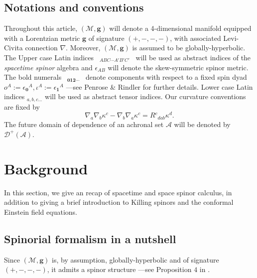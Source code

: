 \documentclass[10pt,a4paper]{article}
\theoremstyle{plain}
\def\bmg{{\bm g}}
\begin{document}
\subsection*{Notations and conventions}

Throughout this article, $(\mathcal{M}, \bmg)$ will denote a
4-dimensional manifold equipped with a Lorentzian metric $\bmg$ of
signature $(+, -, -, -)$, with associated Levi-Civita connection
$\nabla$.  Moreover, $(\mathcal{M}, \bmg)$ is assumed to be
globally-hyperbolic. The Upper case Latin indices ~$_{ABC\cdots
  A'B'C'}$~ will be used as abstract indices of the \emph{spacetime
spinor} algebra and $\epsilon_{AB}$ will denote the skew-symmetric spinor metric. The bold numerals ~$_{\bm0\bm1\bm2\cdots}$~
denote components with respect to a fixed spin dyad $ o^A:=
\epsilon_{\bm0}{}^A,\iota^A:=\epsilon_{\bm1}{}^A $ ---see Penrose \&
Rindler \cite{PenRin84} for further details.  Lower case Latin indices
$_{a,b,c...}$ will be used as abstract tensor indices. Our curvature conventions are fixed by
\[\nabla_{a}\nabla_{b}\kappa^c-\nabla_{b}\nabla_{a}\kappa^c=R{}^{c}{}_{dab}\kappa^{d}.\]
The future domain of dependence of an achronal set $\mathcal{A}$ will
be denoted by $\mathcal{D}^{+}(\mathcal{A})$.


\section{Background}
\label{Background}

In this section, we give an recap of spacetime and space spinor
calculus, in addition to giving a brief introduction to Killing
spinors and the conformal Einstein field equations.

\subsection{Spinorial formalism in a nutshell}
\label{NotationAndSpinorFormalism}

Since $(\mathcal{M}, \bmg)$ is, by assumption, globally-hyperbolic and of signature $(+, -, -, -)$, it
admits a spinor structure ---see Proposition $4$ in
\cite{CFEbook}. 

\medskip
\end{document}
